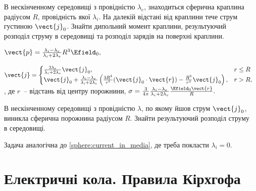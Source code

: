 \begin{problem}\label{sphere:current_in_media}
В нескінченному середовищі з провідністю $\lambda_e$, знаходиться сферична краплина радіусом $R$, провідність якої $\lambda_i$. На далекій відстані від краплини тече струм густиною $\vect{j}_0$. Знайти дипольний момент краплини, результуючий розподіл струму в середовищі та розподіл зарядів на поверхні краплини.
\begin{solution}
	$\vect{p} = \frac{\lambda_i - \lambda_e}{\lambda_i + 2\lambda_e}R^3\Efield_0,$

	$\vect{j} =
		\begin{cases}
			\frac{3\lambda_e}{\lambda_i + 2\lambda_e} \vect{j}_0,                                                                                                    & r \le R \\
			\vect{j}_0  + \frac{\lambda_i - \lambda_e}{\lambda_i + 2\lambda_e} \left( \frac{3R^3}{r^5}(\vect{j}_0\cdot\vect{r}) - \frac{R^3}{r^3}\vect{j}_0\right) , & r > R,
		\end{cases}
	$, де $r$~-- відстань від центру порожнини, $\sigma = \frac{3}{4\pi} \frac{\lambda_i - \lambda_e}{\lambda_i + 2\lambda_e} \frac{\Efield_0\vect{r}}{R}.$
\end{solution}
\end{problem}

\begin{problem}%
В нескінченному середовищі з провідністю $\lambda$, по якому йшов струм $\vect{j}_0$, виникла сферична порожнина радіусом $R$. Знайти результуючий розподіл струму в середовищі.
\begin{solution}
	Задача аналогічна до \ref{sphere:current_in_media}, де треба покласти $\lambda_i = 0$.
\end{solution}
\end{problem}


\section{Електричні кола. Правила Кірхгофа}

